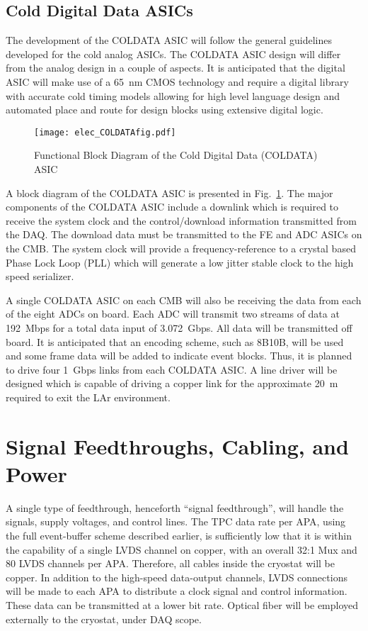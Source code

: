 \subsection{Cold Digital Data ASICs}
\label{subsec:fe_CMOS_digital}

The development of the COLDATA ASIC will follow the general guidelines developed for the cold analog ASICs.
The COLDATA ASIC design will differ from the analog design in a couple of aspects.
It is anticipated that the digital ASIC will make use of a 65~nm CMOS technology and require a
digital library with accurate cold timing models allowing for high level language design and
automated place and route for design blocks using extensive digital logic.  

\begin{figure}[htbp]
\centering
\texttt{[image: elec\_COLDATAfig.pdf]}
\caption{Functional Block Diagram of the Cold Digital Data (COLDATA) ASIC}
\label{fig:elec_COLDATAfig}
\end{figure}
A block diagram of the COLDATA ASIC is presented in Fig.~\ref{fig:elec_COLDATAfig}.
The major components of the COLDATA ASIC include a downlink which is required to receive the system clock and
the control/download information transmitted from the DAQ.
The download data must be transmitted to the FE and ADC ASICs on the CMB.
The system clock will provide a frequency-reference to a crystal based Phase Lock Loop (PLL)
which will generate a low jitter stable clock to the high speed serializer. 

A single COLDATA ASIC on each CMB will also be receiving the data from each of the eight ADCs on board.
Each ADC will transmit two streams of data at 192~Mbps for a total data input of 3.072~Gbps.
All data will be transmitted off board.
It is anticipated that an encoding scheme, such as 8B10B, will be used and
some frame data will be added to indicate event blocks.
Thus, it is planned to drive four 1~Gbps links from each COLDATA ASIC.
A line driver will be designed which is capable of driving a copper link for the approximate 20~m required
to exit the LAr environment. 

%
\section{Signal Feedthroughs, Cabling, and Power}
\label{sec:ce_feedthrough}

A single type of feedthrough, henceforth ``signal feedthrough'', will handle the signals, supply voltages, and control lines.
The TPC data rate per APA, using the full event-buffer scheme described earlier,
is sufficiently low that it is within the capability of a single LVDS channel on copper,
with an overall 32:1 Mux and 80 LVDS channels per APA.
Therefore, all cables inside the cryostat will be copper.
In addition to the high-speed data-output channels,
LVDS connections will be made to each APA to distribute a clock signal and control information.
These data can be transmitted at a lower bit rate.
Optical fiber will be employed externally to the cryostat, under DAQ scope.

